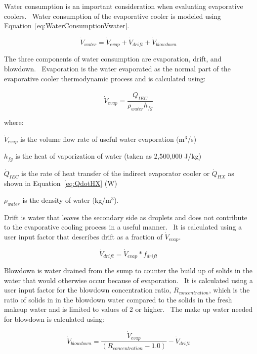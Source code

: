 Water consumption is an important consideration when evaluating evaporative coolers.~ Water consumption of the evaporative cooler is modeled using Equation~\ref{eq:WaterConsumptionVwater}.

\begin{equation}
{\dot V_{water}} = {\dot V_{evap}} + {\dot V_{drift}} + {\dot V_{blowdown}}
\label{eq:WaterConsumptionVwater}
\end{equation}

The three components of water consumption are evaporation, drift, and blowdown.~ Evaporation is the water evaporated as the normal part of the evaporative cooler thermodynamic process and is calculated using:

\begin{equation}
{\dot V_{evap}} = \frac{{{{\dot Q}_{IEC}}}}{{{\rho_{water}}{h_{fg}}}}
\end{equation}

where:

\({\dot V_{evap}}\) is the volume flow rate of useful water evaporation (m\(^{3}\)/s)

\({h_{fg}}\) is the heat of vaporization of water (taken as 2,500,000 J/kg)

\({\dot Q_{IEC}}\) is the rate of heat transfer of the indirect evaporator cooler or \(\dot{Q}_{HX}\) as shown in Equation~\ref{eq:QdotHX} (W)

\({\rho_{water}}\) is the density of water (kg/m\(^{3}\)).

Drift is water that leaves the secondary side as droplets and does not contribute to the evaporative cooling process in a useful manner.~ It is calculated using a user input factor that describes drift as a fraction of \({\dot V_{evap}}\).

\begin{equation}
{\dot V_{drift}} = {\dot V_{evap}} * {f_{drift}}
\end{equation}

Blowdown is water drained from the sump to counter the build up of solids in the water that would otherwise occur because of evaporation.~ It is calculated using a user input factor for the blowdown concentration ratio, \({R_{concentration}}\), which is the ratio of solids in in the blowdown water compared to the solids in the fresh makeup water and is limited to values of 2 or higher.~ The make up water needed for blowdown is calculated using:

\begin{equation}
{\dot V_{blowdown}} = \frac{{{{\dot V}_{evap}}}}{{\left( {{R_{concentration}} - 1.0} \right)}} - {\dot V_{drift}}
\end{equation}

